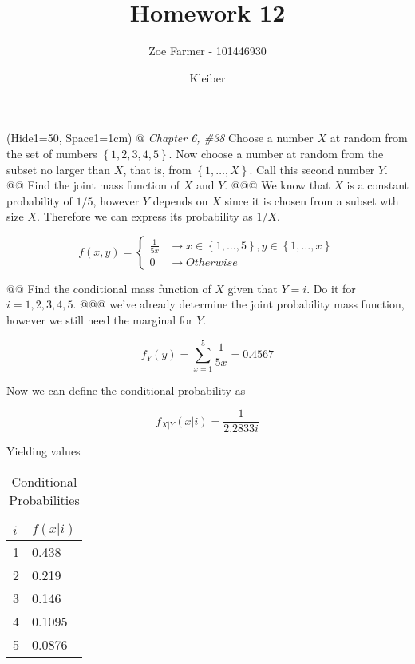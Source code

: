 \documentclass[11pt]{article}\usepackage[]{graphicx}\usepackage[]{xcolor}
\title{Homework 12}
\date{Kleiber}
\author{Zoe Farmer - 101446930}
\begin{document}
\maketitle

\begin{table}[!ht]
    \centering
\end{table}

\begin{easylist}[enumerate]
    \ListProperties(Hide1=50, Space1=1cm)
    @ \textit{Chapter 6, \#38} Choose a number $X$ at random from the set of numbers $\left\{ 1, 2, 3, 4, 5 \right\}$.
    Now choose a number at random from the subset no larger than $X$, that is, from $\left\{ 1, \ldots, X \right\}$.
    Call this second number $Y$.
    @@ Find the joint mass function of $X$ and $Y$.
    @@@ We know that $X$ is a constant probability of $1/5$, however $Y$ depends on $X$ since it is chosen from a subset
    wth size $X$. Therefore we can express its probability as $1 / X$.

    \[
        f(x, y) =
        \begin{cases}
            \frac{1}{5x} &\to x \in \left\{1, \ldots, 5\right\}, y \in \left\{1, \ldots, x\right\}\\
            0 &\to Otherwise
        \end{cases}
    \]

    @@ Find the conditional mass function of $X$ given that $Y = i$. Do it for $i = 1, 2, 3, 4, 5$.
    @@@ we've already determine the joint probability mass function, however we still need the marginal for $Y$.




    \[
        f_Y(y) = \sum_{x = 1}^5 \frac{1}{5x} = 0.4567
    \]

    Now we can define the conditional probability as

    \[
        f_{X|Y}\left( x|i \right) = \frac{1}{2.2833 i}
    \]

    Yielding values

    \begin{table}[H]
        \centering
        \begin{tabular}{|l|l|}
            \hline
            $i$ & $f(x|i)$\\
            \hline
            1 & 0.438\\
            \hline
            2 & 0.219\\
            \hline
            3 & 0.146\\
            \hline
            4 & 0.1095\\
            \hline
            5 & 0.0876\\
            \hline
        \end{tabular}
        \caption{Conditional Probabilities}
    \end{table}


\end{easylist}
\end{document}
